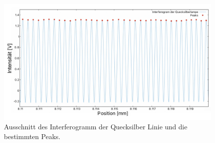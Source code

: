 \begin{figure}[h]
    \centering
    \includegraphics[scale=0.27]{Bilder/Anna/PeaksLow.jpg}
    \caption{Ausschnitt des Interferogramm der Quecksilber Linie und die bestimmten Peaks.}
    \label{fig:PHgLow}
\end{figure}

\newpage
